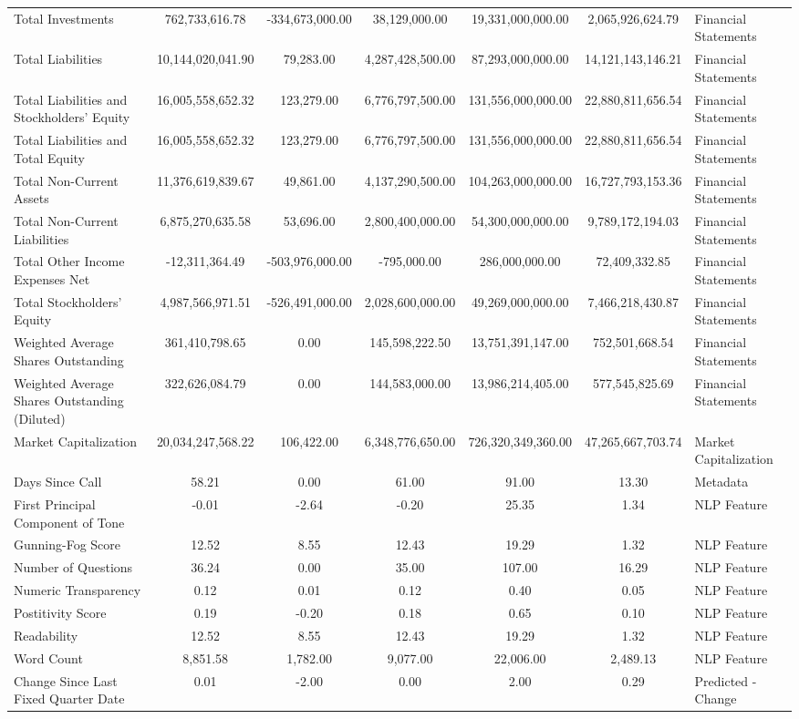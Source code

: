 \begin{tabular}{lccccc}
Total Investments & 762,733,616.78 & -334,673,000.00 & 38,129,000.00 & 19,331,000,000.00 & 2,065,926,624.79 & Financial Statements \\
Total Liabilities & 10,144,020,041.90 & 79,283.00 & 4,287,428,500.00 & 87,293,000,000.00 & 14,121,143,146.21 & Financial Statements \\
Total Liabilities and Stockholders' Equity & 16,005,558,652.32 & 123,279.00 & 6,776,797,500.00 & 131,556,000,000.00 & 22,880,811,656.54 & Financial Statements \\
Total Liabilities and Total Equity & 16,005,558,652.32 & 123,279.00 & 6,776,797,500.00 & 131,556,000,000.00 & 22,880,811,656.54 & Financial Statements \\
Total Non-Current Assets & 11,376,619,839.67 & 49,861.00 & 4,137,290,500.00 & 104,263,000,000.00 & 16,727,793,153.36 & Financial Statements \\
Total Non-Current Liabilities & 6,875,270,635.58 & 53,696.00 & 2,800,400,000.00 & 54,300,000,000.00 & 9,789,172,194.03 & Financial Statements \\
Total Other Income Expenses Net & -12,311,364.49 & -503,976,000.00 & -795,000.00 & 286,000,000.00 & 72,409,332.85 & Financial Statements \\
Total Stockholders' Equity & 4,987,566,971.51 & -526,491,000.00 & 2,028,600,000.00 & 49,269,000,000.00 & 7,466,218,430.87 & Financial Statements \\
Weighted Average Shares Outstanding & 361,410,798.65 & 0.00 & 145,598,222.50 & 13,751,391,147.00 & 752,501,668.54 & Financial Statements \\
Weighted Average Shares Outstanding (Diluted) & 322,626,084.79 & 0.00 & 144,583,000.00 & 13,986,214,405.00 & 577,545,825.69 & Financial Statements \\
Market Capitalization & 20,034,247,568.22 & 106,422.00 & 6,348,776,650.00 & 726,320,349,360.00 & 47,265,667,703.74 & Market Capitalization \\
Days Since Call & 58.21 & 0.00 & 61.00 & 91.00 & 13.30 & Metadata \\
First Principal Component of Tone & -0.01 & -2.64 & -0.20 & 25.35 & 1.34 & NLP Feature \\
Gunning-Fog Score & 12.52 & 8.55 & 12.43 & 19.29 & 1.32 & NLP Feature \\
Number of Questions & 36.24 & 0.00 & 35.00 & 107.00 & 16.29 & NLP Feature \\
Numeric Transparency & 0.12 & 0.01 & 0.12 & 0.40 & 0.05 & NLP Feature \\
Postitivity Score & 0.19 & -0.20 & 0.18 & 0.65 & 0.10 & NLP Feature \\
Readability & 12.52 & 8.55 & 12.43 & 19.29 & 1.32 & NLP Feature \\
Word Count & 8,851.58 & 1,782.00 & 9,077.00 & 22,006.00 & 2,489.13 & NLP Feature \\
Change Since Last Fixed Quarter Date & 0.01 & -2.00 & 0.00 & 2.00 & 0.29 & Predicted - Change \\
\end{tabular}
